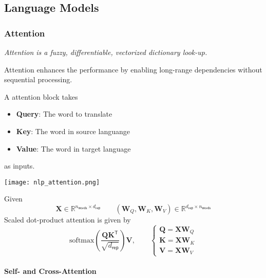 \subsection{Language Models}
\subsubsection{Attention}
\textit{Attention is a fuzzy, differentiable, vectorized dictionary look-up.}

\newpar{}
Attention enhances the performance by enabling long-range dependencies without sequential processing.

\newpar{}
A attention block takes
\begin{itemize}
    \item \textbf{Query}: The word to translate
    \item \textbf{Key}: The word in source languange
    \item \textbf{Value}: The word in target language
\end{itemize}
as inputs.

\newpar{}
\begin{center}
    \texttt{[image: nlp\_attention.png]}
\end{center}

\begin{examplesection}
    Given
    \noindent\begin{equation*}
        \mathbf{X}\in \mathbb{R}^{n_{\mathsf{words}} \times d_{\mathsf{rep}}}\qquad (\mathbf{W}_Q, \mathbf{W}_K, \mathbf{W}_V)\in \mathbb{R}^{d_{\mathsf{rep}}\times n_{\mathsf{words}}}
    \end{equation*}
    Scaled dot-product attention is given by
    \noindent\begin{equation*}
        \mathrm{softmax}\left(\frac{\mathbf{QK}^{\mathsf{T}}}{\sqrt{d_{\mathsf{rep}}}}\right) \mathbf{V},\qquad
        \begin{cases}
            \mathbf{Q} = \mathbf{XW}_Q \\
            \mathbf{K} = \mathbf{XW}_K \\
            \mathbf{V} = \mathbf{XW}_V
        \end{cases}
    \end{equation*}
\end{examplesection}

\paragraph{Self- and Cross-Attention}

